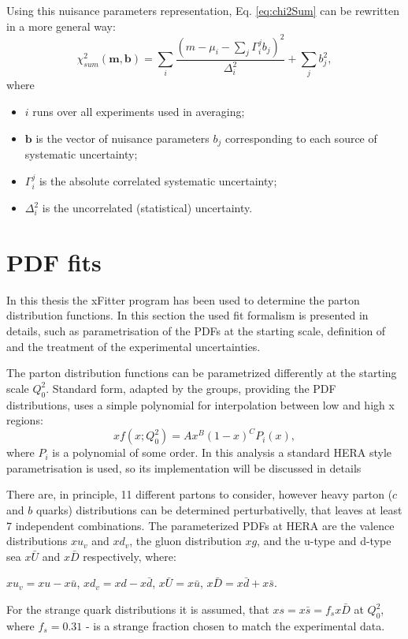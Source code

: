 Using this nuisance parameters representation, Eq. \ref{eq:chi2Sum} can be rewritten in a more general way:
\begin{equation}\label{Eq:ChiDParam}
\chi^{2}_{sum}(\mathbf{m},\mathbf{b})=\sum_{i} \frac{(m-\mu_i-\sum_j\Gamma_i^jb_j)^2}{\Delta_i^2}+\sum_j b_j^2, 
\end{equation}
where
\begin{itemize}
\item $i$ runs over all experiments used in averaging;
\item $\mathbf{b}$ is the vector of nuisance parameters $b_j$ corresponding to each source of systematic uncertainty;
\item $\Gamma_i^j$ is the absolute correlated systematic uncertainty;
\item $\Delta_i^2$ is the uncorrelated (statistical) uncertainty.
\end{itemize}


\section{PDF fits}\label{sec:PDFFit}
In this thesis the xFitter program\cite{Xfitter} has been used to determine the parton distribution functions. In this section the used fit formalism  is presented in details, such as parametrisation of the PDFs at the starting scale, definition of \chiD and the treatment of the experimental uncertainties.

The parton distribution functions can be parametrized differently at the starting scale $Q^2_0$. Standard form, adapted by the groups, providing the PDF distributions, uses a simple polynomial for interpolation between low and high x regions:
\begin{equation}
xf(x; Q^2_0) = A x^{B} (1-x)^{C} P_{i}(x),
\end{equation}
where $P_{i}$ is a polynomial of some order. In this analysis a standard HERA style parametrisation is used, so its implementation will be discussed in details

There are, in principle, 11 different partons to consider, however heavy parton ($c$ and $b$ quarks) distributions can be determined perturbativelly, that leaves at least 7 independent combinations. The parameterized PDFs at HERA are the valence distributions $xu_{v}$ and $xd_{v}$, the gluon distribution $xg$, and the u-type and d-type sea $x\bar{U}$ and $x\bar{D}$ respectively, where:
\begin{center}
$xu_{v} = xu - x\bar{u}$,  $xd_{v} = xd-x\bar{d}$,   $x\bar{U}=x\bar{u}$,  $x\bar{D}=x\bar{d}+x\bar{s}$. 
\end{center}
For the strange quark distributions it is assumed, that $xs = x\bar{s} = f_sx\bar{D}$ at $Q^2_0$, where $f_s = 0.31$ - is a strange fraction chosen to match the experimental data. 

